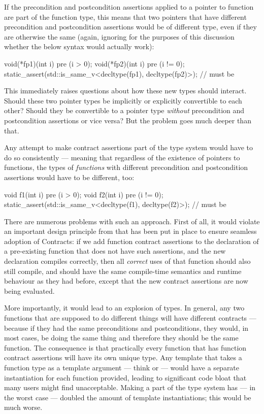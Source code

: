 If the precondition and postcondition assertions applied to a pointer to function are part of the function type, this means that two pointers that have different precondition and postcondition assertions would be of different type, even if they are otherwise the same (again, ignoring for the purposes of this discussion whether the below syntax would actually work):
\begin{codeblock}
void(*fp1)(int i) pre (i > 0);
void(*fp2)(int i) pre (i != 0);
static_assert(std::is_same_v<decltype(fp1), decltype(fp2)>);  // must be 
\end{codeblock}
This immediately raises questions about how these new types should interact. Should these two pointer types be implicitly or explicitly convertible to each other? Should they be convertible to a pointer type \emph{without} precondition and postcondition assertions or vice versa? But the problem goes much deeper than that.

Any attempt to make contract assertions part of the type system would have to do so consistently --- meaning that regardless of the existence of pointers to functions, the types of \emph{functions} with different precondition and postcondition assertions would have to be different, too:
\begin{codeblock}
void f1(int i) pre (i > 0);
void f2(int i) pre (i != 0);
static_assert(std::is_same_v<decltype(f1), decltype(f2)>);  // must be 
\end{codeblock}
There are numerous problems with such an approach. First of all, it would violate an important design principle from \cite{P2900R7} that has been put in place to ensure seamless adoption of Contracts: if we add function contract assertions to the declaration of a pre-existing function that does not have such assertions, and the new declaration compiles correctly, then all \emph{correct} uses of that function should also still compile, and should have the same compile-time semantics and runtime behaviour as they had before, except that the new contract assertions are now being evaluated.

More importantly, it would lead to an explosion of types. In general, any two functions that are supposed to do different things will have different contracts --- because if they had the same preconditions and postconditions, they would, in most cases, be doing the same thing and therefore they should be the same function. The consequence is that practically every function that has function contract assertions will have its own unique type. Any template that takes a function type as a template argument --- think  or  --- would have a separate instantiation for each function provided, leading to significant code bloat that many users might find unacceptable. Making  a part of the type system has --- in the worst case --- doubled the amount of template instantiations; this would be much worse.

